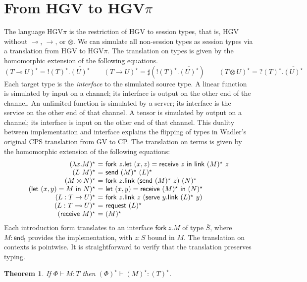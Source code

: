 \documentclass{easychair}
\makeatletter
\newtheorem{theorem}{Theorem}
\newcommand{\ba}{\begin{array}}
\newcommand{\ea}{\end{array}}
\newenvironment{equations}{\[\ba{@{}r@{~}c@{~}l@{}}}{\ea\]}
\newcommand{\key}{\mathsf}
\newcommand{\gvOutput}[2]{\mathord{!}{#1}.{#2}}
\newcommand{\gvInput}[2]{\mathord{?}{#1}.{#2}}
\newcommand{\gvEndOutput}{\key{end}_!}
\newcommand{\gvService}[1]{\sharp {#1}}
\newcommand{\gvDual}[1]{\overline{#1}}
\newcommand{\gvj}[3]{{#1} \vdash {#2} : {#3}}
\newcommand{\lolli}{\multimap}
\newcommand{\gvLinFun}[2]{{#1} \lolli {#2}}
\newcommand{\gvUnFun}[2]{{#1} \to {#2}}
\newcommand{\gvTimes}[2]{{#1} \otimes {#2}}
\newcommand{\gvLink}[2]{\key{link}~{#1}~{#2}}
\newcommand{\gvLam}[2]{\lambda {#1}.{#2}}
\newcommand{\gvApp}[2]{{#1}~{#2}}
\newcommand{\gvPair}[2]{({#1},{#2})}
\newcommand{\gvLet}[3]{\key{let}~{#1}={#2}~\key{in}~{#3}}
\newcommand{\gvSend}[2]{\key{send}~{#1}~{#2}}
\newcommand{\gvReceive}[1]{\key{receive}~{#1}}
\newcommand{\gvFork}[2]{\key{fork}~{#1}.{#2}}
\newcommand{\gvServe}[2]{\key{serve}~{#1}.{#2}}
\newcommand{\gvRequest}[1]{\key{request}~{#1}}
\newcommand{\hgv}{HGV\xspace}
\newcommand{\hgvpi}{HGV$\pi$\xspace}
\newcommand{\lampi}[1]{({#1})^\star}
\makeatother
\begin{document}
\section{From \hgv to \hgvpi}

The language \hgvpi is the restriction of \hgv to session types, that is, \hgv without $\lolli$,
$\to$, or $\otimes$. We can simulate all non-session types as session types via a translation from
\hgv to \hgvpi. The translation on types is given by the homomorphic extension of the following
equations.
\[
\lampi{\gvLinFun{T}{U}} = \gvOutput{\lampi{T}}{\gvDual{\lampi{U}}} \qquad
\lampi{\gvUnFun{T}{U}} = \gvService{(\gvOutput{\lampi{T}}{\gvDual{\lampi{U}}})} \qquad
\lampi{\gvTimes{T}{U}} = \gvInput{\lampi{T}}{\gvDual{\lampi{U}}}
\]%
Each target type is the \emph{interface} to the simulated source type. A linear function is
simulated by input on a channel; its interface is output on the other end of the channel. An
unlimited function is simulated by a server; its interface is the service on the other end of that
channel. A tensor is simulated by output on a channel; its interface is input on the other end of
that channel.
%
This duality between implementation and interface explains the flipping of types in Wadler's
original CPS translation from GV to CP.
%
The translation on terms is given by the homomorphic extension of the following equations:
\begin{equations}
\lampi{\gvLam{x}{M}} &=& \gvFork{z}{\gvLet{\gvPair{x}{z}}{\gvReceive{z}}{\gvLink{\lampi{M}}{z}}} \\
\lampi{\gvApp{L}{M}} &=& \gvSend{\lampi{M}}{\lampi{L}} \\
\lampi{\gvTimes{M}{N}} &=&
  \gvFork{z}
    {\gvLink{(\gvSend{\lampi{M}}{z})}{\lampi{N}}} \\
\lampi{\gvLet{\gvPair{x}{y}}{M}{N}} &=&
    \gvLet{\gvPair{x}{y}}{\gvReceive{\lampi{M}}}{\lampi{N}} \\
\lampi{L : \gvUnFun{T}{U}} &=&
  \gvFork{z}{\gvLink{z}{(\gvServe{y}{\gvLink{\lampi{L}}{y}})}} \\
\lampi{L : \gvLinFun{T}{U}} &=& \gvRequest{\lampi{L}} \\
\lampi{\gvReceive{M}} &=& \lampi{M} \\
\end{equations}%
Each introduction form translates to an interface $\gvFork{z}{M}$ of type $\gvDual{S}$, where $M :
\gvEndOutput$ provides the implementation, with $z : S$ bound in $M$.
%
The translation on contexts is pointwise.
It is straightforward to verify that the translation preserves typing.
\begin{theorem}
If $\gvj{\Phi}{M}{T}$ then $\gvj{\lampi{\Phi}}{\lampi{M}}{\lampi{T}}$.
\end{theorem}
\end{document}
